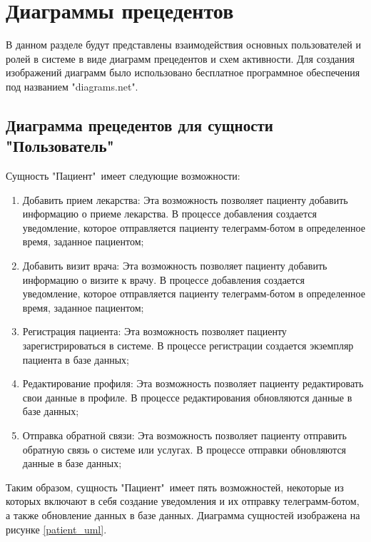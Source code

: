 \documentclass[14pt]{extreport}
\begin{document}
\chapter{Диаграммы прецедентов}
    В данном разделе будут представлены взаимодействия основных пользователей %
    и ролей в системе в виде диаграмм прецедентов и схем активности. Для создания %
    изображений диаграмм было использовано бесплатное программное обеспечения под названием %
    "diagrams.net".\ \cite{diagrams_dot_net} %
    
    \section{Диаграмма прецедентов для сущности "Пользователь"\ }
        Сущность "Пациент"\ имеет следующие возможности:
        \begin{enumerate}
            \item Добавить прием лекарства: Эта возможность позволяет пациенту добавить %
            информацию о приеме лекарства. В процессе добавления создается уведомление, %
            которое отправляется пациенту телеграмм-ботом в определенное время, заданное пациентом;
            \item Добавить визит врача: Эта возможность позволяет пациенту добавить информацию о %
            визите к врачу. В процессе добавления создается уведомление, которое отправляется пациенту %
            телеграмм-ботом в определенное время, заданное пациентом;
            \item Регистрация пациента: Эта возможность позволяет пациенту зарегистрироваться в системе. %
            В процессе регистрации создается экземпляр пациента в базе данных;
            \item Редактирование профиля: Эта возможность позволяет пациенту редактировать свои данные в %
            профиле. В процессе редактирования обновляются данные в базе данных;
            \item Отправка обратной связи: Эта возможность позволяет пациенту отправить обратную связь о системе %
            или услугах. В процессе отправки обновляются данные в базе данных;
        \end{enumerate}
        
        Таким образом, сущность "Пациент"\ имеет пять возможностей, некоторые из которых %
        включают в себя создание уведомления и их отправку телеграмм-ботом, а также обновление %
        данных в базе данных. Диаграмма сущностей изображена на рисунке \ref{patient_uml}.
\end{document}
